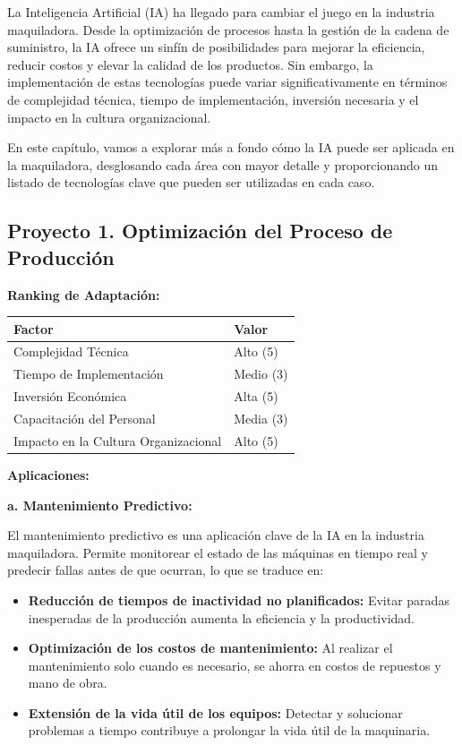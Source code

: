 \documentclass[
  10pt,
  letterpaper,
]{book}
\providecommand{\tightlist}{%
  \setlength{\itemsep}{0pt}\setlength{\parskip}{0pt}}\usepackage{longtable,booktabs,array}
\begin{document}
La Inteligencia Artificial (IA) ha llegado para cambiar el juego en la
industria maquiladora. Desde la optimización de procesos hasta la
gestión de la cadena de suministro, la IA ofrece un sinfín de
posibilidades para mejorar la eficiencia, reducir costos y elevar la
calidad de los productos. Sin embargo, la implementación de estas
tecnologías puede variar significativamente en términos de complejidad
técnica, tiempo de implementación, inversión necesaria y el impacto en
la cultura organizacional.

En este capítulo, vamos a explorar más a fondo cómo la IA puede ser
aplicada en la maquiladora, desglosando cada área con mayor detalle y
proporcionando un listado de tecnologías clave que pueden ser utilizadas
en cada caso.

\subsection{Proyecto 1. Optimización del Proceso de
Producción}\label{proyecto-1.-optimizaciuxf3n-del-proceso-de-producciuxf3n}

\textbf{Ranking de Adaptación:}

\begin{longtable}[]{@{}ll@{}}
\toprule\noalign{}
Factor & Valor \\
\midrule\noalign{}
\endhead
\bottomrule\noalign{}
\endlastfoot
Complejidad Técnica & Alto (5) \\
Tiempo de Implementación & Medio (3) \\
Inversión Económica & Alta (5) \\
Capacitación del Personal & Media (3) \\
Impacto en la Cultura Organizacional & Alto (5) \\
\end{longtable}

\textbf{Aplicaciones:}

\textbf{a. Mantenimiento Predictivo:}

El mantenimiento predictivo es una aplicación clave de la IA en la
industria maquiladora. Permite monitorear el estado de las máquinas en
tiempo real y predecir fallas antes de que ocurran, lo que se traduce
en:

\begin{itemize}
\tightlist
\item
  \textbf{Reducción de tiempos de inactividad no planificados:} Evitar
  paradas inesperadas de la producción aumenta la eficiencia y la
  productividad.
\item
  \textbf{Optimización de los costos de mantenimiento:} Al realizar el
  mantenimiento solo cuando es necesario, se ahorra en costos de
  repuestos y mano de obra.
\item
  \textbf{Extensión de la vida útil de los equipos:} Detectar y
  solucionar problemas a tiempo contribuye a prolongar la vida útil de
  la maquinaria.
\end{itemize}
\end{document}
